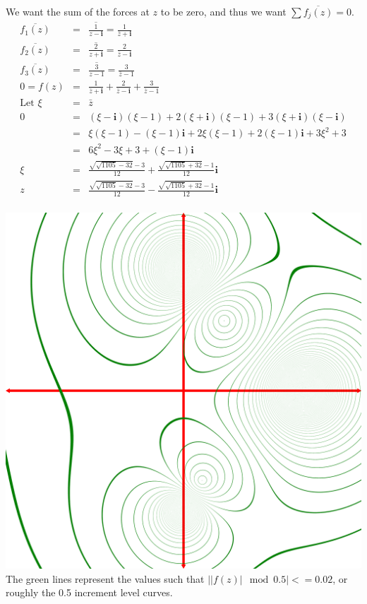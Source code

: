 \documentclass{article}%
\newcommand\abs[1]{\left|#1\right|}
\newcommand\I{\textbf{i}}
\begin{document}
\begin{enumerate}
    We want the sum of the forces at $z$ to be zero, and thus we want $\sum{\overline{f_j(z)}} = 0$.
    \begin{eqnarray*}
        \overline{f_1(z)} &=& \overline{\frac{1}{z-\I}} = \frac{1}{\bar{z}+\I} \\
        \overline{f_2(z)} &=& \overline{\frac{2}{z+\I}} = \frac{2}{\bar{z}-\I}\\
        \overline{f_3(z)} &=& \overline{\frac{3}{z-1}} = \frac{3}{\bar{z}-1} \\
        0 = f(z) &=& \frac{1}{\bar{z}+\I}+\frac{2}{\bar{z}-\I}+\frac{3}{\bar{z}-1} \\
        \text{Let } \xi &=& \bar{z} \\
        0 &=& (\xi-\I)(\xi-1) + 2(\xi+\I)(\xi-1)+3(\xi+\I)(\xi-\I) \\
          &=& \xi(\xi-1)-(\xi-1)\I + 2\xi(\xi - 1)+2(\xi-1)\I + 3\xi^2+3 \\
          &=& 6 \xi^2 -3 \xi + 3 + (\xi-1)\I \\
        \xi &=& \frac{\sqrt{\sqrt{1105}-32}-3}{12} + \frac{\sqrt{\sqrt{1105}+32}-1}{12}\I \\
        z   &=& \frac{\sqrt{\sqrt{1105}-32}-3}{12} - \frac{\sqrt{\sqrt{1105}+32}-1}{12}\I \\
    \end{eqnarray*}
    \begin{center}
        \includegraphics[scale=0.2]{images/charge_field.png}\\
        The green lines represent the values such that $\abs{\abs{f(z)} \mod{0.5}} <= 0.02$, or roughly the  0.5 increment level curves.
    \end{center}
\end{enumerate}
\end{document}
